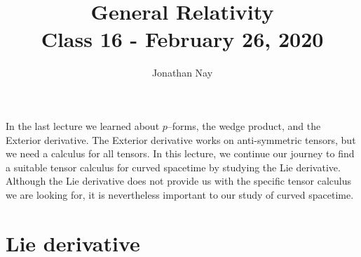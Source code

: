\documentclass[10pt]{article}
\title{{\Huge General Relativity}\\{\Large{Class 16 - February 26, 2020}}} %
\author{Jonathan Nay}
\begin{document}
    \maketitle
    \flushbottom
    \newpage
    \pagestyle{fancynotes}
	In the last lecture we learned about $p$--forms, the wedge product, and the Exterior derivative. The Exterior derivative works on anti-symmetric tensors, but we need a calculus for all tensors. In this lecture, we continue our journey to find a suitable tensor calculus for curved spacetime by studying the Lie derivative. Although the Lie derivative does not provide us with the specific tensor calculus we are looking for, it is nevertheless important to our study of curved spacetime.
     \section{Lie derivative}
\end{document}
